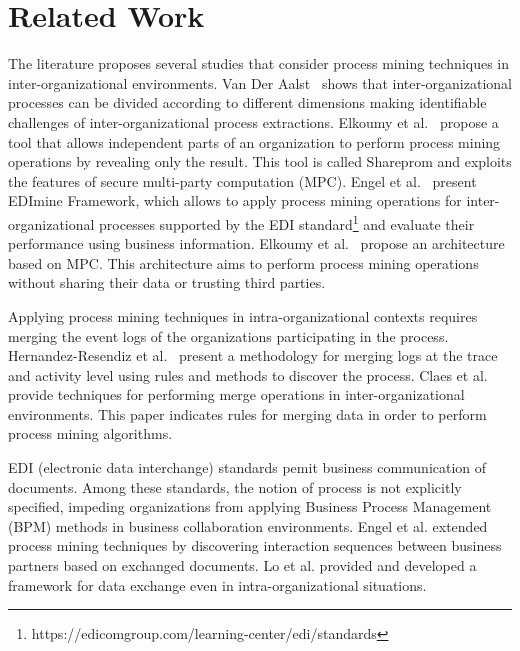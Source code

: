 \section{Related Work}
\label{sec:background}

The literature proposes several studies that consider process mining techniques in inter-organizational environments.  Van Der Aalst~\cite{van2011intra} shows that inter-organizational processes can be divided according to different dimensions making identifiable challenges of inter-organizational process extractions. Elkoumy et al.~\cite{elkoumy2020shareprom} propose a tool that allows independent parts of an organization to perform process mining operations by revealing only the result. This tool is called Shareprom and exploits the features of secure multi-party computation (MPC). Engel et al.~\cite{engel2016analyzing}
present EDImine Framework, which allows to apply process mining operations for inter-organizational processes supported by the EDI standard\footnote{https://edicomgroup.com/learning-center/edi/standards} and evaluate their performance using business information.
Elkoumy et al.~\cite{elkoumy2020secure} propose an architecture based on MPC. This architecture aims to perform process mining operations without sharing their data or trusting third parties.


Applying process mining techniques in intra-organizational contexts requires merging the event logs of the organizations participating in the process. Hernandez-Resendiz et al.~\cite{hernandez2021merging} present a methodology for merging logs at the trace and activity level using rules and methods to discover the process. Claes et al.~\cite{claes2014merging} provide techniques for performing merge operations in inter-organizational environments. This paper indicates rules for merging data in order to perform process mining algorithms.

EDI (electronic data interchange) standards pemit business communication of documents. Among these standards, the notion of process is not explicitly specified, impeding organizations from applying Business Process Management (BPM) methods in business collaboration environments. Engel et al.\cite{engel2011process} extended process mining techniques by discovering interaction sequences between business partners based on exchanged documents. Lo et al.\cite{lo2020flexible} provided and developed a framework for data exchange even in intra-organizational situations. 
\cite{arfaoui2014trusted}
\cite{XIE2023321}

